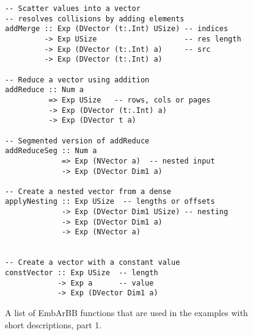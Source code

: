 


\begin{figure}
\begin{small}
\begin{Verbatim}
-- Scatter values into a vector 
-- resolves collisions by adding elements
addMerge :: Exp (DVector (t:.Int) USize) -- indices
         -> Exp USize                    -- res length
         -> Exp (DVector (t:.Int) a)     -- src
         -> Exp (DVector (t:.Int) a) 

-- Reduce a vector using addition
addReduce :: Num a 
          => Exp USize   -- rows, cols or pages
          -> Exp (DVector (t:.Int) a) 
          -> Exp (DVector t a) 

-- Segmented version of addReduce
addReduceSeg :: Num a 
             => Exp (NVector a)  -- nested input
             -> Exp (DVector Dim1 a)

-- Create a nested vector from a dense
applyNesting :: Exp USize  -- lengths or offsets
             -> Exp (DVector Dim1 USize) -- nesting
             -> Exp (DVector Dim1 a)     
             -> Exp (NVector a)


-- Create a vector with a constant value
constVector :: Exp USize  -- length
            -> Exp a      -- value
            -> Exp (DVector Dim1 a) 
\end{Verbatim}
\end{small}
\caption{A list of EmbArBB functions that are used in the examples with 
         short descriptions, part 1.} 
\label{fig:listoffunA}
\end{figure} 


